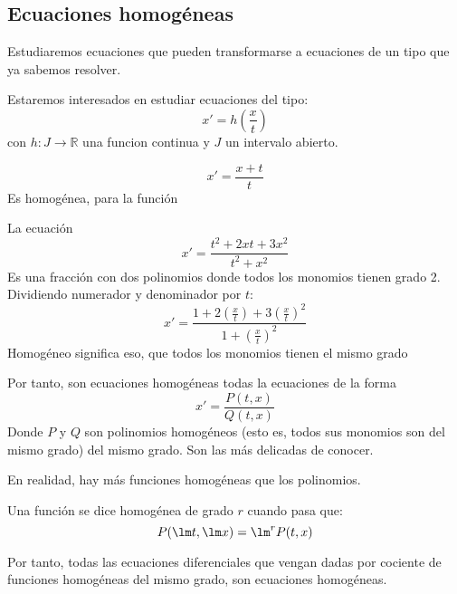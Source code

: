 \subsection{Ecuaciones homogéneas}
Estudiaremos ecuaciones que pueden transformarse a ecuaciones de un tipo que ya sabemos resolver.

Estaremos interesados en estudiar ecuaciones del tipo:
\begin{equation*}
    x' = h\left(\dfrac{x}{t}\right)
\end{equation*}
con $h:J\rightarrow\mathbb{R}$ una funcion continua y $J$ un intervalo abierto.

\begin{ejemplo}
    \begin{equation*}
        x' = \dfrac{x+t}{t}
    \end{equation*}
    Es homogénea, para la función 
\end{ejemplo}

\begin{ejemplo}
    La ecuación
    \begin{equation*}
        x' = \dfrac{t^2 + 2xt + 3x^2}{t^2 + x^2}
    \end{equation*}
    Es una fracción con dos polinomios donde todos los monomios tienen grado 2. Dividiendo numerador y denominador por $t$:
    \begin{equation*}
        x' = \dfrac{1+2\left(\frac{x}{t}\right) + 3{(\frac{x}{t})}^{2}}{1 + {(\frac{x}{t})}^{2}}
    \end{equation*}
    Homogéneo significa eso, que todos los monomios tienen el mismo grado
\end{ejemplo}
Por tanto, son ecuaciones homogéneas todas la ecuaciones de la forma
\begin{equation*}
    x' = \dfrac{P(t,x)}{Q(t,x)}
\end{equation*}
Donde $P$ y $Q$ son polinomios homogéneos (esto es, todos sus monomios son del mismo grado) del mismo grado. Son las más delicadas de conocer.

En realidad, hay más funciones homogéneas que los polinomios.

\begin{definicion}
    Una función se dice homogénea de grado $r$ cuando pasa que:
    \begin{equation*}
        P(\lm t, \lm x) = \lm^r P(t,x)
    \end{equation*}
\end{definicion}
Por tanto, todas las ecuaciones diferenciales que vengan dadas por cociente de funciones homogéneas del mismo grado, son ecuaciones homogéneas.

